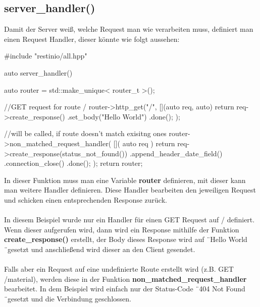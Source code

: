 \documentclass[german,oneside,color]{htldipl}
\begin{document}
\subsection{server\_handler()}
Damit der Server weiß, welche Request man wie verarbeiten muss, definiert man einen Request Handler, dieser könnte wie folgt aussehen:
\begin{program}[H]
\begin{JavaCode}
#include "restinio/all.hpp"

auto server_handler() {
    auto router = std::make_unique< router_t >();

    //GET request for route /
    router->http_get("/", [](auto req, auto) {
        return req->create_response()
            .set_body("Hello World")
            .done();
    });
    
    //will be called, if route doesn't match exisitng ones
    router->non_matched_request_handler(
        []( auto req ){
            return
                req->create_response(status_not_found())
                    .append_header_date_field()
                    .connection_close() 
                    .done();
        });
    return router;
}
\end{JavaCode}
\end{program}

In dieser Funktion muss man eine Variable \textbf{router} definieren, mit dieser kann man weitere Handler definieren. Diese Handler bearbeiten den jeweiligen Request und schicken einen entsprechenden Response zurück.
\\ \\
In diesem Beispiel wurde nur ein Handler für einen GET Request auf / definiert. Wenn dieser aufgerufen wird, dann wird ein Response mithilfe der Funktion \textbf{create\_response()} erstellt, der Body dieses Response wird auf \"\ Hello World \"\  gesetzt und anschließend wird dieser an den Client gesendet.
\\ \\
Falls aber ein Request auf eine undefinierte Route erstellt wird (z.B. GET /material), werden diese in der Funktion \textbf{non\_matched\_request\_handler} bearbeitet. In dem Beispiel wird einfach nur der Status-Code \"\ 404 Not Found \"\ gesetzt und die Verbindung geschlossen.
\end{document}
